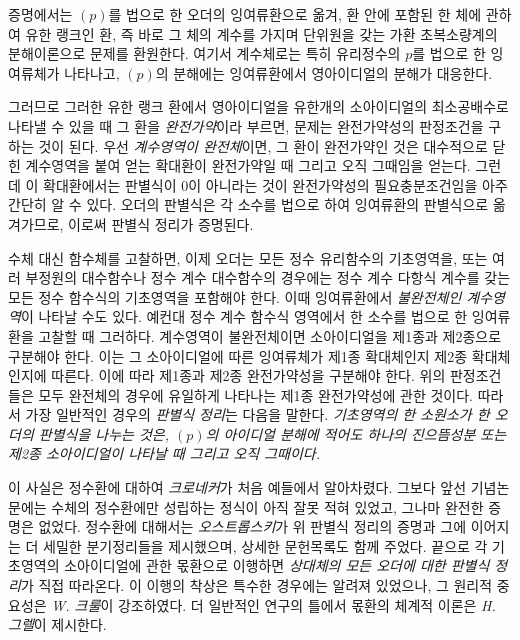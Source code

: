 증명에서는 \((p)\)를 법으로 한 오더의 잉여류환으로 옮겨, 환 안에 포함된 한 체에 관하여 유한 랭크인 환, 즉 바로 그 체의 계수를 가지며 단위원을 갖는 가환 초복소량계의 분해이론으로 문제를 환원한다. 여기서 계수체로는 특히 유리정수의 \(p\)를 법으로 한 잉여류체가 나타나고, \((p)\)의 분해에는 잉여류환에서 영아이디얼의 분해가 대응한다.

그러므로 그러한 유한 랭크 환에서 영아이디얼을 유한개의 소아이디얼의 최소공배수로 나타낼 수 있을 때 그 환을 \emph{완전가약}이라 부르면, 문제는 완전가약성의 판정조건을 구하는 것이 된다. 우선 \emph{계수영역이 완전체}이면, 그 환이 완전가약인 것은 대수적으로 닫힌 계수영역을 붙여 얻는 확대환이 완전가약일 때 그리고 오직 그때임을 얻는다. 그런데 이 확대환에서는 판별식이 0이 아니라는 것이 완전가약성의 필요충분조건임을 아주 간단히 알 수 있다. 오더의 판별식은 각 소수를 법으로 하여 잉여류환의 판별식으로 옮겨가므로, 이로써 판별식 정리가 증명된다.

수체 대신 함수체를 고찰하면, 이제 오더는 모든 정수 유리함수의 기초영역을, 또는 여러 부정원의 대수함수나 정수 계수 대수함수의 경우에는 정수 계수 다항식 계수를 갖는 모든 정수 함수식의 기초영역을 포함해야 한다. 이때 잉여류환에서 \emph{불완전체인 계수영역}이 나타날 수도 있다. 예컨대 정수 계수 함수식 영역에서 한 소수를 법으로 한 잉여류환을 고찰할 때 그러하다. 계수영역이 불완전체이면 소아이디얼을 제1종과 제2종으로 구분해야 한다. 이는 그 소아이디얼에 따른 잉여류체가 제1종 확대체인지 제2종 확대체인지에 따른다. 이에 따라 제1종과 제2종 완전가약성을 구분해야 한다. 위의 판정조건들은 모두 완전체의 경우에 유일하게 나타나는 제1종 완전가약성에 관한 것이다. 따라서 가장 일반적인 경우의 \emph{판별식 정리}는 다음을 말한다. \emph{기초영역의 한 소원소가 한 오더의 판별식을 나누는 것은, \((p)\)의 아이디얼 분해에 적어도 하나의 진으뜸성분 또는 제2종 소아이디얼이 나타날 때 그리고 오직 그때이다.}

이 사실은 정수환에 대하여 \emph{크로네커}가 처음 예들에서 알아차렸다. 그보다 앞선 기념논문에는 수체의 정수환에만 성립하는 정식이 아직 잘못 적혀 있었고, 그나마 완전한 증명은 없었다. 정수환에 대해서는 \emph{오스트롭스키}가 위 판별식 정리의 증명과 그에 이어지는 더 세밀한 분기정리들을 제시했으며, 상세한 문헌목록도 함께 주었다. 끝으로 각 기초영역의 소아이디얼에 관한 몫환으로 이행하면 \emph{상대체의 모든 오더에 대한 판별식 정리}가 직접 따라온다. 이 이행의 착상은 특수한 경우에는 알려져 있었으나, 그 원리적 중요성은 \emph{W. 크룰}이 강조하였다. 더 일반적인 연구의 틀에서 몫환의 체계적 이론은 \emph{H. 그렐}이 제시한다.


